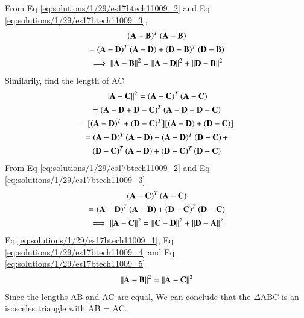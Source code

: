 From Eq \eqref{eq:solutions/1/29/es17btech11009_2} and Eq \eqref{eq:solutions/1/29/es17btech11009_3},
\begin{multline}
    \left(\mathbf{A-B}\right)^{T}\left(\mathbf{A-B}\right)\\
    = \left(\mathbf{A-D}\right)^{T}\left(\mathbf{A-D}\right) + \left(\mathbf{D-B}\right)^{T}\left(\mathbf{D-B}\right)\\
    \implies\left\lVert\mathbf{A-B}\right\rVert^2=\left\lVert\mathbf{A-D}\right\rVert^2 + \left\lVert\mathbf{D-B}\right\rVert^2 \label{eq:solutions/1/29/es17btech11009_4}
\end{multline}
Similarily, find the length of AC
\begin{multline}
 \left\lVert\mathbf{A-C}\right\rVert^2=\left(\mathbf{A-C}\right)^{T}\left(\mathbf{A-C}\right)\\ =\left(\mathbf{A-D+D-C}\right)^{T}\left(\mathbf{A-D+D-C}\right)\\
 = [\left(\mathbf{A-D}\right)^{T}+\left(\mathbf{D-C}\right)^{T}][\left(\mathbf{A-D}\right)+\left(\mathbf{D-C}\right)]\\
 =\left(\mathbf{A-D}\right)^{T}\left(\mathbf{A-D}\right) + \left(\mathbf{A-D}\right)^{T}\left(\mathbf{D-C}\right) +\\ \left(\mathbf{D-C}\right)^{T}\left(\mathbf{A-D}\right) + \left(\mathbf{D-C}\right)^{T}\left(\mathbf{D-C}\right)
\end{multline}
From Eq \eqref{eq:solutions/1/29/es17btech11009_2} and Eq \eqref{eq:solutions/1/29/es17btech11009_3}
\begin{multline}
    \left(\mathbf{A-C}\right)^{T}\left(\mathbf{A-C}\right)\\
     = \left(\mathbf{A-D}\right)^{T}\left(\mathbf{A-D}\right) + \left(\mathbf{D-C}\right)^{T}\left(\mathbf{D-C}\right)\\
    \implies\left\lVert\mathbf{A-C}\right\rVert^2=\left\lVert\mathbf{C-D}\right\rVert^2 + \left\lVert\mathbf{D-A}\right\rVert^2\label{eq:solutions/1/29/es17btech11009_5}
\end{multline}
Eq \eqref{eq:solutions/1/29/es17btech11009_1}, Eq \eqref{eq:solutions/1/29/es17btech11009_4} and Eq \eqref{eq:solutions/1/29/es17btech11009_5}
\begin{align}
      \left\lVert\mathbf{A-B}\right\rVert^2=\left\lVert\mathbf{A-C}\right\rVert^2 
\end{align}
Since the lengths AB and AC are equal, We can conclude that the $\Delta$ABC is an isosceles triangle with AB = AC.

